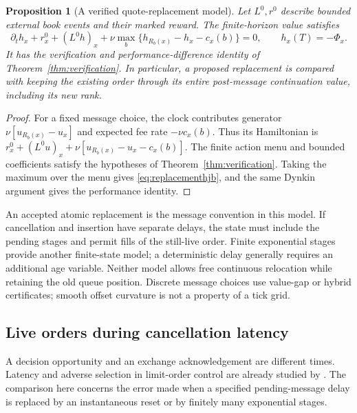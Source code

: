 \documentclass[11pt]{article}
\theoremstyle{plain}
\newtheorem{proposition}[theorem]{Proposition}
\theoremstyle{definition}
\theoremstyle{remark}
\begin{document}
\begin{proposition}[A verified quote-replacement model]
\label{prop:replacementclock}
Let \(L^0,r^0\) describe bounded external book events and their
marked reward. The finite-horizon value satisfies
\begin{equation}\label{eq:replacementhjb}
\partial_t h_x+r_x^0+(L^0h)_x
 +\nu\max_b\{h_{R_b(x)}-h_x-c_x(b)\}=0,
\qquad h_x(T)=-\Phi_x.
\end{equation}
It has the verification and performance-difference identity of
Theorem~\ref{thm:verification}. In particular, a proposed replacement
is compared with keeping the existing order through its entire
post-message continuation value, including its new rank.
\end{proposition}
\begin{proof}
For a fixed message choice, the clock contributes generator
\(\nu[u_{R_b(x)}-u_x]\) and expected fee rate \(-\nu c_x(b)\).
Thus its Hamiltonian is
\(r_x^0+(L^0u)_x+\nu[u_{R_b(x)}-u_x-c_x(b)]\).
The finite action menu and bounded coefficients satisfy the hypotheses
of Theorem~\ref{thm:verification}. Taking the maximum over the menu
gives \eqref{eq:replacementhjb}, and the same Dynkin argument gives
the performance identity.
\end{proof}

An accepted atomic replacement is the message convention in this
model. If cancellation and insertion have separate delays, the state
must include the pending stages and permit fills of the still-live
order. Finite exponential stages provide another finite-state model;
a deterministic delay generally requires an additional age variable.
Neither model allows free continuous relocation while retaining the
old queue position. Discrete message choices use value-gap or hybrid
certificates; smooth offset curvature is not a property of a tick grid.

\subsection{Live orders during cancellation latency}
\label{sec:cancellatency}

A decision opportunity and an exchange acknowledgement are different
times. Latency and adverse selection in limit-order control are
already studied by \citet{LehalleMounjid2017}. The comparison here
concerns the error made when a specified pending-message delay is
replaced by an instantaneous reset or by finitely many exponential
stages.
\end{document}
